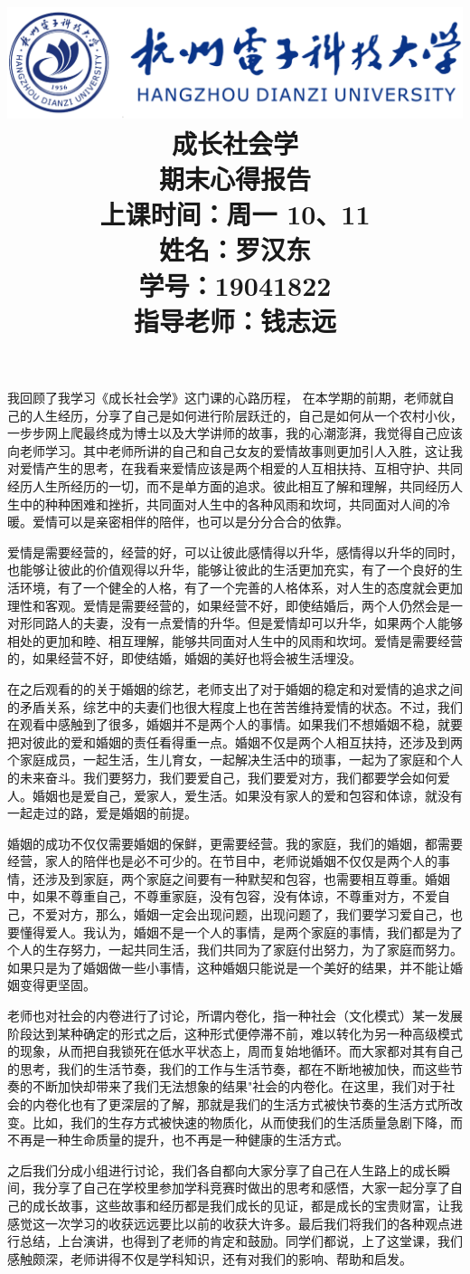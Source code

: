 \documentclass[UTF8]{ctexart}
\title{
	\includegraphics[scale = 1]{HDU.png}\\
    \vspace{1in}
    \textmd{ \Huge\textbf{成长社会学}}\\
    \textmd{\textbf{期末心得报告}}\\
   	\vspace{3.5in}
   	\large{上课时间：周一 10、11}\\
	\textmd{姓名：罗汉东}\\
	\textmd{学号：19041822}\\
	\textmd{指导老师：钱志远 }\\
}
\begin{document}
\maketitle
\newpage
我回顾了我学习《成长社会学》这门课的心路历程，
在本学期的前期，老师就自己的人生经历，分享了自己是如何进行阶层跃迁的，自己是如何从一个农村小伙，一步步网上爬最终成为博士以及大学讲师的故事，我的心潮澎湃，我觉得自己应该向老师学习。其中老师所讲的自己和自己女友的爱情故事则更加引人入胜，这让我对爱情产生的思考，在我看来爱情应该是两个相爱的人互相扶持、互相守护、共同经历人生所经历的一切，而不是单方面的追求。彼此相互了解和理解，共同经历人生中的种种困难和挫折，共同面对人生中的各种风雨和坎坷，共同面对人间的冷暖。爱情可以是亲密相伴的陪伴，也可以是分分合合的依靠。

爱情是需要经营的，经营的好，可以让彼此感情得以升华，感情得以升华的同时，也能够让彼此的价值观得以升华，能够让彼此的生活更加充实，有了一个良好的生活环境，有了一个健全的人格，有了一个完善的人格体系，对人生的态度就会更加理性和客观。爱情是需要经营的，如果经营不好，即使结婚后，两个人仍然会是一对形同路人的夫妻，没有一点爱情的升华。但是爱情却可以升华，如果两个人能够相处的更加和睦、相互理解，能够共同面对人生中的风雨和坎坷。爱情是需要经营的，如果经营不好，即使结婚，婚姻的美好也将会被生活埋没。

在之后观看的的关于婚姻的综艺，老师支出了对于婚姻的稳定和对爱情的追求之间的矛盾关系，综艺中的夫妻们也很大程度上也在苦苦维持爱情的状态。不过，我们在观看中感触到了很多，婚姻并不是两个人的事情。如果我们不想婚姻不稳，就要把对彼此的爱和婚姻的责任看得重一点。婚姻不仅是两个人相互扶持，还涉及到两个家庭成员，一起生活，生儿育女，一起解决生活中的琐事，一起为了家庭和个人的未来奋斗。我们要努力，我们要爱自己，我们要爱对方，我们都要学会如何爱人。婚姻也是爱自己，爱家人，爱生活。如果没有家人的爱和包容和体谅，就没有一起走过的路，爱是婚姻的前提。

婚姻的成功不仅仅需要婚姻的保鲜，更需要经营。我的家庭，我们的婚姻，都需要经营，家人的陪伴也是必不可少的。在节目中，老师说婚姻不仅仅是两个人的事情，还涉及到家庭，两个家庭之间要有一种默契和包容，也需要相互尊重。婚姻中，如果不尊重自己，不尊重家庭，没有包容，没有体谅，不尊重对方，不爱自己，不爱对方，那么，婚姻一定会出现问题，出现问题了，我们要学习爱自己，也要懂得爱人。我认为，婚姻不是一个人的事情，是两个家庭的事情，我们都是为了个人的生存努力，一起共同生活，我们共同为了家庭付出努力，为了家庭而努力。如果只是为了婚姻做一些小事情，这种婚姻只能说是一个美好的结果，并不能让婚姻变得更坚固。

老师也对社会的内卷进行了讨论，所谓内卷化，指一种社会（文化模式）某一发展阶段达到某种确定的形式之后，这种形式便停滞不前，难以转化为另一种高级模式的现象，从而把自我锁死在低水平状态上，周而复始地循环。而大家都对其有自己的思考，我们的生活节奏，我们的工作与生活节奏，都在不断地被加快，而这些节奏的不断加快却带来了我们无法想象的结果"社会的内卷化。在这里，我们对于社会的内卷化也有了更深层的了解，那就是我们的生活方式被快节奏的生活方式所改变。比如，我们的生存方式被快速的物质化，从而使我们的生活质量急剧下降，而不再是一种生命质量的提升，也不再是一种健康的生活方式。

之后我们分成小组进行讨论，我们各自都向大家分享了自己在人生路上的成长瞬间，我分享了自己在学校里参加学科竞赛时做出的思考和感悟，大家一起分享了自己的成长故事，这些故事和经历都是我们成长的见证，都是成长的宝贵财富，让我感觉这一次学习的收获远远要比以前的收获大许多。最后我们将我们的各种观点进行总结，上台演讲，也得到了老师的肯定和鼓励。同学们都说，上了这堂课，我们感触颇深，老师讲得不仅是学科知识，还有对我们的影响、帮助和启发。
\end{document}
